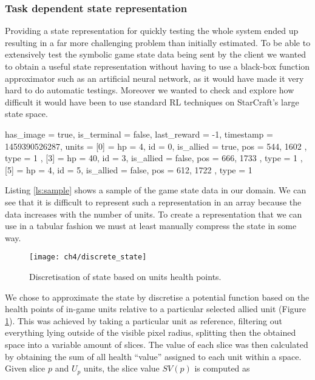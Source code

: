 \subsubsection{Task dependent state representation}

Providing a state representation for quickly testing the whole system ended up
resulting in a far more challenging problem than initially estimated. To be able
to extensively test the symbolic game state data being sent by the client we
wanted to obtain a useful state representation without having to use a black-box
function approximator such as an artificial neural network, as it would have
made it very hard to do automatic testings. Moreover we wanted to check and
explore how difficult it would have been to use standard RL techniques on
StarCraft's large state space.

\begin{sflisting}[caption=Example of a game state Lua table recorded by the
  agent, label=ls:sample] [standard]
{
  has_image = true,
  is_terminal = false,
  last_reward = -1,
  timestamp = 1459390526287,
  units = {
    [0] = {
      hp = 4,
      id = 0,
      is_allied = true,
      pos = { 544, 1602 },
      type = 1
    },
    [3] = {
      hp = 40,
      id = 3,
      is_allied = false,
      pos = { 666, 1733 },
      type = 1
    },
    [5] = {
      hp = 4,
      id = 5,
      is_allied = false,
      pos = { 612, 1722 },
      type = 1
    }
  }
}

\end{sflisting}

Listing \ref{ls:sample} shows a sample of the game state data in our
domain. We can see that it is difficult to represent such a representation in an
array because the data increases with the number of units. To create a
representation that we can use in a tabular fashion we must at least manually
compress the state in some way.

\begin{figure}[h]
    \centering
    \texttt{[image: ch4/discrete\_state]}
    \caption{Discretisation of state based on units health points.}
    \label{fig:discrete_state}
\end{figure}

We chose to approximate the state by discretise a potential function
\citep{diebelthrun} based on the health points of in-game units relative to a
particular selected allied unit (Figure \ref{fig:discrete_state}). This was
achieved by taking a particular unit as reference, filtering out everything
lying outside of the visible pixel radius, splitting then the obtained space
into a variable amount of slices. The value of each slice was then calculated by
obtaining the sum of all health ``value'' assigned to each unit within a space.
Given slice $p$ and $U_p$ units, the slice value $SV(p)$ is computed as

